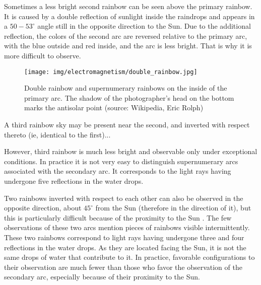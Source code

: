 	Sometimes a less bright second rainbow can be seen above the primary rainbow. It is caused by a double reflection of sunlight inside the raindrops and appears in a $50-53^\circ$ angle still in the opposite direction to the Sun. Due to the additional reflection, the colors of the second arc are reversed relative to the primary arc, with the blue outside and red inside, and the arc is less bright. That is why it is more difficult to observe. 
	\begin{figure}[H]
		\centering
		\texttt{[image: img/electromagnetism/double\_rainbow.jpg]}
		\caption[]{Double rainbow and supernumerary rainbows on the inside of the primary arc. The shadow of the photographer's head on the bottom marks the antisolar point (source: Wikipedia, Eric Rolph)}
	\end{figure}
	A third rainbow sky may be present near the second, and inverted with respect thereto (ie, identical to the first)...
	
	However, third rainbow is much less bright and observable only under exceptional conditions. In practice it is not very easy to distinguish supernumerary arcs associated with the secondary arc. It corresponds to the light rays having undergone five reflections in the water drops. 

	Two rainbows inverted with respect to each other can also be observed in the opposite direction, about $45^\circ$ from the Sun (therefore in the direction of it), but this is particularly difficult because of the proximity to the Sun . The few observations of these two arcs mention pieces of rainbows visible intermittently. These two rainbows correspond to light rays having undergone three and four reflections in the water drops. As they are located facing the Sun, it is not the same drops of water that contribute to it. In practice, favorable configurations to their observation are much fewer than those who favor the observation of the secondary arc, especially because of their proximity to the Sun.

